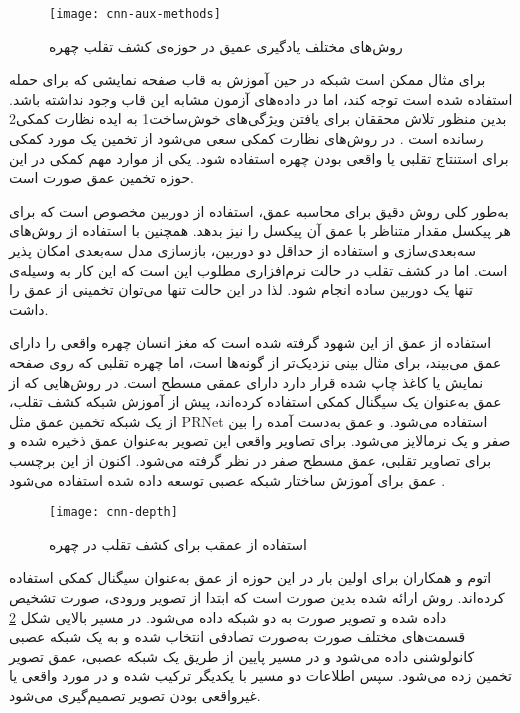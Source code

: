 \begin{figure}[h]
	\centerline{\texttt{[image: cnn-aux-methods]}}
	\caption{روش‌های مختلف یادگیری عمیق در حوزه‌ی کشف تقلب چهره \cite{yu2021deep}}
	\label{fig:cnn-aux-methods}
\end{figure}

برای مثال ممکن است شبکه در حین آموزش به قاب صفحه نمایشی که برای حمله استفاده شده است توجه کند، اما در داده‌های آزمون مشابه این قاب وجود نداشته باشد. بدین منظور تلاش محققان برای یافتن ویژگی‌های خوش‌ساخت1 به ایده نظارت کمکی2 رسانده است
\cite{liu2018learning}.  
در روش‌های نظارت کمکی سعی می‌شود از تخمین یک مورد کمکی برای استنتاج تقلبی یا واقعی بودن چهره استفاده شود. یکی از موارد مهم کمکی در این حوزه تخمین عمق صورت است.


به‌طور کلی روش دقیق برای محاسبه عمق، استفاده از دوربین مخصوص است که برای هر پیکسل مقدار متناظر با عمق آن پیکسل را نیز بدهد. همچنین با استفاده از روش‌های سه‌بعدی‌سازی و استفاده از حداقل دو دوربین، بازسازی مدل سه‌بعدی امکان پذیر است. اما در کشف تقلب در حالت نرم‌افزاری مطلوب این است که این کار به وسیله‌ی تنها یک دوربین ساده انجام شود. لذا در این حالت تنها می‌توان تخمینی از عمق را داشت.


استفاده از عمق از این شهود گرفته شده است که مغز انسان چهره واقعی را دارای عمق می‌بیند، برای مثال بینی نزدیک‌تر از گونه‌ها است، اما چهره تقلبی که روی صفحه نمایش یا کاغذ چاپ شده قرار دارد دارای عمقی مسطح است. در روش‌هایی که از عمق به‌عنوان یک سیگنال کمکی استفاده کرده‌اند، پیش از آموزش شبکه کشف تقلب، از یک شبکه تخمین عمق مثل 
PRNet \cite{feng2018joint} 
استفاده می‌شود. و عمق به‌دست آمده را بین صفر و یک نرمالایز می‌شود. برای تصاویر واقعی این تصویر به‌عنوان عمق ذخیره شده و برای تصاویر تقلبی، عمق مسطح صفر در نظر گرفته می‌شود. اکنون از این برچسب عمق برای آموزش ساختار شبکه عصبی توسعه داده شده استفاده می‌شود
\cite{atoum2017face,yu2020searching,shao2019multi,liu2018learning,wang2020deep,wang2018exploiting}.
\begin{figure}[h]
	\centerline{\texttt{[image: cnn-depth]}}
	\caption{استفاده از عمقب برای کشف تقلب در چهره  \cite{atoum2017face}}
	\label{fig:cnn-depth}
\end{figure}

اتوم و همکاران
\cite{atoum2017face}
  برای اولین بار در این حوزه از عمق به‌عنوان سیگنال کمکی استفاده کرده‌اند. روش ارائه شده بدین صورت است که ابتدا از تصویر ورودی، صورت تشخیص داده شده و تصویر صورت به دو شبکه داده می‌شود. در مسیر بالایی شکل
\ref{fig:cnn-depth}
   قسمت‌های مختلف صورت به‌صورت تصادفی انتخاب شده و به یک شبکه عصبی کانولوشنی داده می‌شود و در مسیر پایین از طریق یک شبکه عصبی، عمق تصویر تخمین زده می‌شود. سپس اطلاعات دو مسیر با یکدیگر ترکیب شده و در مورد واقعی یا غیرواقعی بودن تصویر تصمیم‌گیری می‌شود.
   
